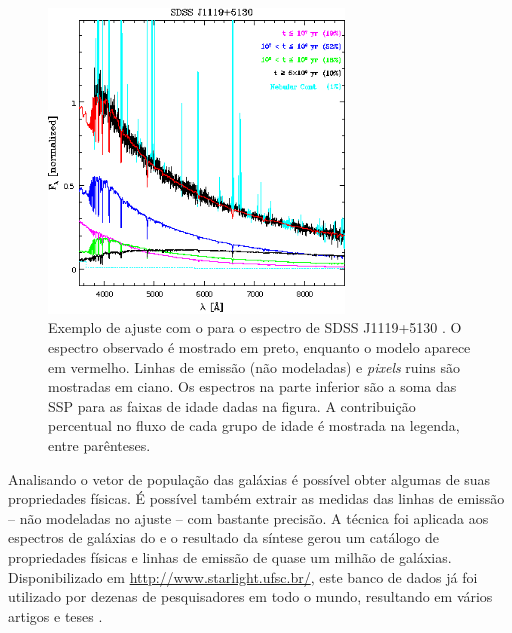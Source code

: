 \begin{figure}
	\includegraphics[width=0.7\textwidth]{figuras/starlight-fit.eps}
	\caption[Exemplo de ajuste de espectro com o \starlight.]
	{Exemplo de ajuste com o \starlight para o espectro de SDSS J1119+5130
	\citep[figura 2]{CidFernandes2006}. O espectro observado é mostrado em preto,
	enquanto o modelo aparece em vermelho. Linhas de emissão (não modeladas) e {\em
	pixels} ruins são mostradas em ciano. Os espectros na parte inferior são a soma
	das SSP para as faixas de idade dadas na figura. A contribuição percentual no
	fluxo de cada grupo de idade é mostrada na legenda, entre parênteses.}
	\label{fig:StarlightSpectrumSample}
\end{figure}

Analisando o vetor de população das galáxias é possível obter algumas de suas
propriedades físicas. É possível também extrair as medidas das linhas de emissão
-- não modeladas no ajuste -- com bastante precisão. A técnica foi aplicada aos
espectros de galáxias do \SDSS e o resultado da síntese gerou um catálogo de
propriedades físicas e linhas de emissão de quase um milhão de galáxias.
Disponibilizado em \url{http://www.starlight.ufsc.br/}, este banco de dados já
foi utilizado por dezenas de pesquisadores em todo o mundo, resultando em vários
artigos \citep{Bla, Bla1, Bla2} e teses \citep{Ble, Ble1, Ble2}.\fixme



